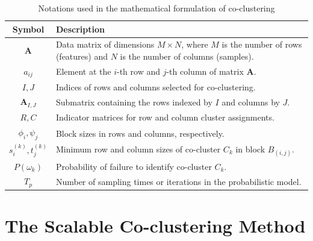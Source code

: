 \documentclass[letterpaper, 10 pt, conference]{ieeeconf}  %
\begin{document}
\begin{table}[h]
    \centering
    \begin{tabular}{c|p{10cm}}
        \hline
        \textbf{Symbol}        & \textbf{Description}                                                                                                           \\
        \hline
        $\mathbf{A}$           & Data matrix of dimensions $M \times N$, where $M$ is the number of rows (features) and $N$ is the number of columns (samples). \\
        $a_{ij}$               & Element at the $i$-th row and $j$-th column of matrix $\mathbf{A}$.                                                            \\
        $I, J$                 & Indices of rows and columns selected for co-clustering.                                                                        \\
        $\mathbf{A}_{I, J}$    & Submatrix containing the rows indexed by $I$ and columns by $J$.                                                               \\
        $R, C$                 & Indicator matrices for row and column cluster assignments.                                                                     \\
        $\phi_i, \psi_j$       & Block sizes in rows and columns, respectively.                                                                                 \\
        $s_i^{(k)}, t_j^{(k)}$ & Minimum row and column sizes of co-cluster $C_k$ in block $B_{(i,j)}$.                                                         \\
        $P(\omega_k)$          & Probability of failure to identify co-cluster $C_k$.                                                                           \\
        $T_p$                  & Number of sampling times or iterations in the probabilistic model.                                                             \\
        \hline
    \end{tabular}
    \caption{Notations used in the mathematical formulation of co-clustering}
    \label{tab:notations}
\end{table}

\section{The Scalable Co-clustering Method}
\label{sec:method}
\end{document}
